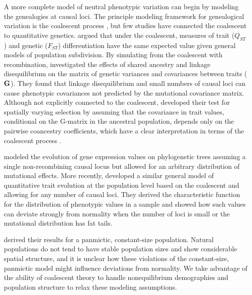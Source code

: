 A more complete model of neutral phenotypic variation can begin by modeling the
genealogies at causal loci. The principle modeling framework for genealogical
variation is the coalescent process \citep{Wakeley2008}, but few studies have
connected the coalescent to quantitative genetics. \citet{Whitlock1999} argued
that under the coalescent, measures of trait ($Q_{ST}$) and genetic ($F_{ST}$)
differentiation have the same expected value given general models of population
subdivision. By simulating from the coalescent with recombination,
\citet{Griswold2007} investigated the effects of shared ancestry and linkage
disequilibrium on the matrix of genetic variances and covariances between traits
($\mbox{\textbf{G}}$). They found that linkage disequilibrium and small numbers
of causal loci can cause phenotypic covariances not predicted by the mutational
covariance matrix. Although not explicitly connected to the coalescent,
\citet{Ovaskainen2011} developed their test for spatially varying selection by
assuming that the covariance in trait values, conditional on the G-matrix in the
ancestral population, depends only on the pairwise coancestry coefficients,
which have a clear interpretation in terms of the coalescent process
\citep{Slatkin1991}.

\citet{Khaitovich2005} modeled the evolution of gene expression values on
phylogenetic trees assuming a single non-recombining causal locus but allowed
for an arbitrary distribution of mutational effects. More
recently, \citet{Schraiber2015} developed a similar general model of
quantitative trait evolution at the population level based on the coalescent and
allowing for any number of causal loci. They derived the characteristic function
for the distribution of phenotypic values in a sample and showed how such values
can deviate strongly from normality when the number of loci is small or the
mutational distribution has fat tails.

\citet{Schraiber2015} derived their results for a panmictic, constant-size
population. Natural populations do not tend to have stable population sizes and
show considerable spatial structure, and it is unclear how these violations of
the constant-size, panmictic model might influence deviations from normality. We
take advantage of the ability of coalescent theory to handle nonequilibrium
demographies and population structure to relax these modeling assumptions.

